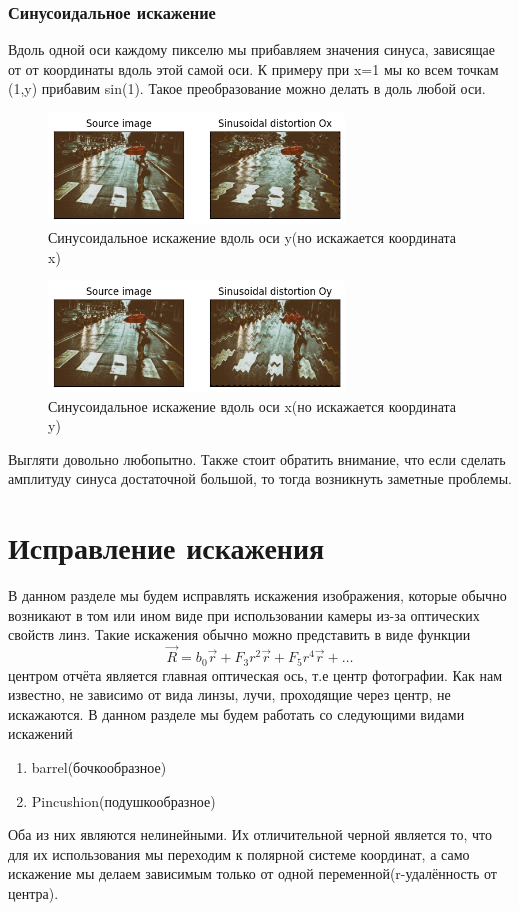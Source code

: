\documentclass[a4paper,12pt]{article}
\begin{document}
\subsubsection{Синусоидальное искажение}
Вдоль одной оси каждому пикселю мы прибавляем значения синуса, зависящае от от координаты вдоль этой самой оси. К примеру при x=1 мы ко всем точкам (1,y) прибавим sin(1). Такое преобразование можно делать в доль любой оси.
\begin{figure}[H]
    \centering \includegraphics[width=0.7\textwidth]{my_images/36.png}
    \caption{Синусоидальное искажение вдоль оси y(но искажается координата x)}
\end{figure}
\begin{figure}[H]
    \centering \includegraphics[width=0.7\textwidth]{my_images/37.png}
    \caption{Синусоидальное искажение вдоль оси x(но искажается координата y)}
\end{figure}
Выгляти довольно любопытно. Также стоит обратить внимание, что если сделать амплитуду синуса достаточной большой, то тогда возникнуть заметные проблемы.
\section{Исправление искажения}
В данном разделе мы будем исправлять искажения изображения, которые обычно возникают в том или ином виде при использовании камеры из-за оптических свойств линз. 
Такие искажения обычно можно представить в виде функции
$$
	\vec{R}=b_0\vec{r}+F_3r^2\vec{r}+F_5r^4\vec{r}+\dots
$$
центром отчёта является главная оптическая ось, т.е центр фотографии. Как нам известно, не зависимо от вида линзы, лучи, проходящие через центр, не искажаются. 
В данном разделе мы будем работать со следующими видами искажений
\begin{enumerate}
    \item barrel(бочкообразное)
    \item Pincushion(подушкообразное)
\end{enumerate}
Оба из них являются нелинейными. Их отличительной черной является то, что для их использования мы переходим к полярной системе координат, а само искажение мы делаем зависимым только от одной переменной(r-удалённость от центра).
\end{document}
